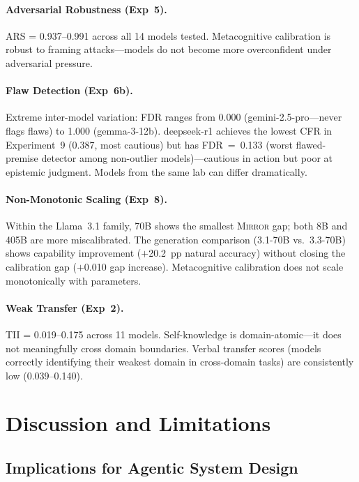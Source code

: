 \documentclass[10pt]{article}
\newcommand{\mirror}{\textsc{Mirror}}
\newcommand{\ARS}{ARS}
\newcommand{\CFR}{CFR}
\newcommand{\FDR}{FDR}
\newcommand{\TII}{TII}
\begin{document}
\paragraph{Adversarial Robustness (Exp~5).}
\ARS{} = 0.937--0.991 across all 14 models tested. Metacognitive calibration is
robust to framing attacks---models do not become more overconfident under
adversarial pressure.

\paragraph{Flaw Detection (Exp~6b).}
Extreme inter-model variation: \FDR{} ranges from 0.000 (gemini-2.5-pro---never
flags flaws) to 1.000 (gemma-3-12b). deepseek-r1 achieves the lowest \CFR{} in
Experiment~9 (0.387, most cautious) but has \FDR{}~=~0.133 (worst flawed-premise
detector among non-outlier models)---cautious in action but poor at epistemic
judgment. Models from the same lab can differ dramatically.

\paragraph{Non-Monotonic Scaling (Exp~8).}
Within the Llama~3.1 family, 70B shows the smallest \mirror{} gap; both 8B and
405B are more miscalibrated. The generation comparison (3.1-70B vs.\ 3.3-70B)
shows capability improvement ($+$20.2~pp natural accuracy) without closing the
calibration gap ($+$0.010 gap increase). Metacognitive calibration does not scale
monotonically with parameters.

\paragraph{Weak Transfer (Exp~2).}
\TII{} = 0.019--0.175 across 11 models. Self-knowledge is domain-atomic---it does
not meaningfully cross domain boundaries. Verbal transfer scores (models correctly
identifying their weakest domain in cross-domain tasks) are consistently low
(0.039--0.140).

\section{Discussion and Limitations}
\label{sec:discussion}

\subsection{Implications for Agentic System Design}
\end{document}
